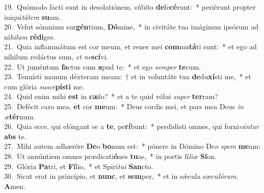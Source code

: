 {19.~}Quómodo facti sunt in desolatiónem, súbito \textbf{de}fe\textbf{cé}runt:~* periérunt propter iniqui\textit{tá}\textit{tem} \textbf{su}am.\\
{20.~}Velut sómnium sur\textbf{gén}tium, \textbf{Dó}mine,~* in civitáte tua imáginem ipsórum ad ní\textit{hi}\textit{lum} \textbf{ré}\textbf{di}ges.\\
{21.~}Quia inflammátum est cor meum, et renes mei \textbf{com}mu\textbf{tá}ti sunt:~* et ego ad níhilum redáctus sum, \textit{et} \textit{ne}\textbf{scí}vi.\\
{22.~}Ut juméntum \textbf{fa}ctus sum \textbf{a}pud te:~* et ego \textit{sem}\textit{per} \textbf{te}cum.\\
{23.~}Tenuísti manum déxteram meam:~† et in voluntáte tua \textbf{de}du\textbf{xí}sti me,~* et cum glória \textit{su}\textit{sce}\textbf{pí}\textbf{sti} me.\\
{24.~}Quid enim mihi \textbf{est} in \textbf{cæ}lo?~* et a te quid vólui \textit{su}\textit{per} \textbf{ter}ram?\\
{25.~}Defécit caro mea, \textbf{et} cor \textbf{me}um:~* Deus cordis mei, et pars mea Deus \textit{in} \textit{æ}\textbf{tér}num.\\
{26.~}Quia ecce, qui elóngant se a \textbf{te}, pe\textbf{rí}bunt:~* perdidísti omnes, qui forni\textit{cán}\textit{tur} \textbf{abs} te.\\
{27.~}Mihi autem adhærére \textbf{De}o \textbf{bo}num est:~* pónere in Dómino De\textit{o} \textit{spem} \textbf{me}am:\\
{28.~}Ut annúntiem omnes prædicati\textbf{ó}nes \textbf{tu}as,~* in portis fí\textit{li}\textit{æ} \textbf{Si}on.\\
{29.~}Glória \textbf{Pa}tri, et \textbf{Fí}lio,~* et Spirí\textit{tu}\textit{i} \textbf{San}cto.\\
{30.~}Sicut erat in princípio, et \textbf{nunc}, et \textbf{sem}per,~* et in sǽcula sæcu\textit{ló}\textit{rum}. \textbf{A}men.\\
